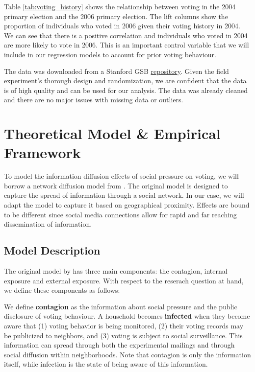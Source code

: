 \documentclass[11pt]{article}
\begin{document}
\begin{table}[H]
    \centering
    \caption{Relationship between 2004 and 2006 Voting}
    \label{tab:voting_history}
    
\end{table}

Table \ref{tab:voting_history} shows the relationship between voting in the 2004 primary election and the 2006 primary election. The lift columns show the proportion of individuals who voted in 2006 given their voting history in 2004. We can see that there is a positive correlation and individuals who voted in 2004 are more likely to vote in 2006. This is an important control variable that we will include in our regression models to account for prior voting behaviour.

The data was downloaded from a Stanford GSB \href{https://github.com/gsbDBI/ExperimentData}{repository}. Given the field experiment's thorough design and randomization, we are confident that the data is of high quality and can be used for our analysis. The data was already cleaned and there are no major issues with missing data or outliers.

\section{Theoretical Model \& Empirical Framework}
To model the information diffusion effects of social pressure on voting, we will borrow a network diffusion model from \cite{myers_information_2012}. The original model is designed to capture the spread of information through a social network. In our case, we will adapt the model to capture it based on geographical proximity. Effects are bound to be different since social media connections allow for rapid and far reaching dissemination of information.

\subsection{Model Description}
The original model by \cite{myers_information_2012} has three main components: the contagion, internal exposure and external exposure. With respect to the reserach question at hand, we define these components as follows:

We define \textbf{contagion} as the information about social pressure and the public disclosure of voting behaviour. A household becomes \textbf{infected} when they become aware that (1) voting behavior is being monitored, (2) their voting records may be publicized to neighbors, and (3) voting is subject to social surveillance. This information can spread through both the experimental mailings and through social diffusion within neighborhoods. Note that contagion is only the information itself, while infection is the state of being aware of this information.
\end{document}

